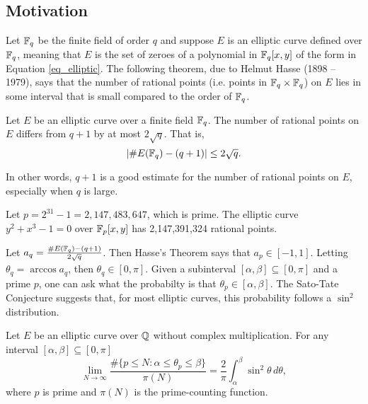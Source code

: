 \subsection{Motivation}

Let $\mathbb{F}_q$ be the finite field of order $q$ and suppose $E$ is an elliptic curve defined over $\mathbb{F}_q$,
meaning that $E$ is the set of zeroes of a polynomial in $\mathbb{F}_q[x,y]$ of the form in Equation \ref{eq_elliptic}.
The following theorem, due to Helmut Hasse (1898 -- 1979), says that
the number of rational points (i.e. points in $\mathbb{F}_q \times \mathbb{F}_q$) on $E$
lies in some interval that is small compared to the order of $\mathbb{F}_q$.
\begin{theorem}[Hasse]
  Let $E$ be an elliptic curve over a finite field $\mathbb{F}_q$.
  The number of rational points on $E$ differs from $q + 1$ by at most $2 \sqrt q$. That is,
  \[ | \#E(\mathbb{F}_q) - (q + 1) | \leq 2 \sqrt q. \]
\end{theorem}
In other words,
$q + 1$ is a good estimate for the number of rational points on $E$,
especially when $q$ is large.

\begin{example}
  Let $p = 2^{31} - 1 = 2,147,483,647$, which is prime.
  The elliptic curve $y^2 + x^3 - 1 = 0$ over $\mathbb{F}_p[x,y]$ has 2,147,391,324 rational points.
\end{example}

Let $a_q = \frac {\#E(\mathbb{F}_q) - (q + 1)} {2\sqrt q}$.
Then Hasse's Theorem says that $a_p \in [-1, 1]$.
Letting $\theta_q = \arccos a_q$, then $\theta_q \in [0, \pi]$.
Given a subinterval $[\alpha, \beta] \subseteq [0, \pi]$ and a prime $p$,
one can ask what the probabilty is that $\theta_p \in [\alpha, \beta]$.
The Sato-Tate Conjecture suggests that, for most elliptic curves, this probability follows a $\sin^2$ distribution.

\begin{conjecture}
  Let $E$ be an elliptic curve over $\mathbb{Q}$ without complex multiplication.
  For any interval $[\alpha, \beta] \subseteq [0, \pi]$
  \[ \lim_{N \to \infty}
    \frac {\#\{ p \leq N : \alpha \leq \theta_p \leq \beta \}} {\pi(N)} =
    \frac 2 \pi \int_{\alpha}^{\beta} \sin^2 \theta\,d\theta, \]
  where $p$ is prime and $\pi(N)$ is the prime-counting function.
\end{conjecture}

